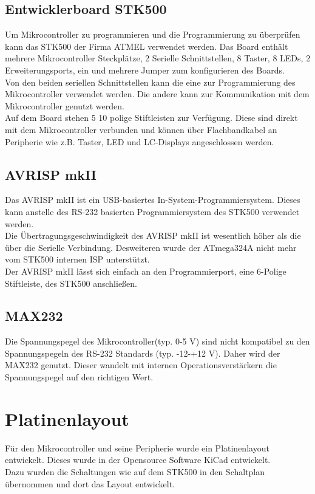 \subsection{Entwicklerboard STK500}
Um Mikrocontroller zu programmieren und die Programmierung zu überprüfen kann das  STK500 der Firma ATMEL verwendet werden. Das Board enthält mehrere Mikrocontroller Steckplätze, 2 Serielle Schnittstellen, 8 Taster, 8 LEDs, 2 Erweiterungsports, ein   und mehrere Jumper zum konfigurieren des Boards.\\
Von den beiden seriellen Schnittstellen kann die eine zur Programmierung des Mikrocontroller verwendet werden. Die andere kann zur Kommunikation mit dem Mikrocontroller genutzt werden.\\
Auf dem Board stehen 5 10 polige Stiftleisten 
zur Verfügung. Diese sind direkt mit dem Mikrocontroller verbunden und können über Flachbandkabel an Peripherie wie z.B. Taster, LED und LC-Displays angeschlossen werden.

\subsection{AVRISP mkII}
Das AVRISP mkII ist ein USB-basiertes In-System-Programmiersystem. Dieses kann anstelle des RS-232 basierten Programmiersystem des STK500 verwendet werden.\\
Die Übertragungsgeschwindigkeit des AVRISP mkII ist wesentlich höher als die über die Serielle Verbindung. Desweiteren wurde der ATmega324A nicht mehr vom STK500 internen ISP unterstützt.\\
Der AVRISP mkII lässt sich einfach an den Programmierport, eine 6-Polige Stiftleiste, des STK500 anschließen.

\subsection{MAX232}
Die Spannungspegel des Mikrocontroller(typ. 0-5 V) sind nicht kompatibel zu den Spannungspegeln des RS-232 Standards (typ. -12-+12 V). Daher wird der  MAX232 genutzt. Dieser wandelt mit internen Operationsverstärkern die Spannungspegel auf den richtigen Wert.
\section{Platinenlayout}
Für den Mikrocontroller und seine Peripherie wurde ein Platinenlayout entwickelt. Dieses wurde in der Opensource Software KiCad entwickelt. \\ 
Dazu wurden die Schaltungen wie auf dem STK500 in den Schaltplan übernommen und dort das Layout entwickelt. 